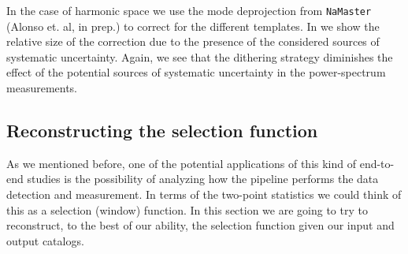 \documentclass[\docopts]{\docclass}
\begin{document}
In the case of harmonic space we use the mode deprojection from \texttt{NaMaster} (Alonso et. al, in prep.) to correct for the different templates. In  we show the relative size of the correction due to the presence of the considered sources of systematic uncertainty. Again, we see that the dithering strategy diminishes the effect of the potential sources of systematic uncertainty in the power-spectrum measurements.





\subsection{Reconstructing the selection function}

As we mentioned before, one of the potential applications of this kind of end-to-end studies is the possibility of analyzing how the pipeline performs the data detection and measurement. In terms of the two-point statistics we could think of this as a selection (window) function. In this section we are going to try to reconstruct, to the best of our ability, the selection function given our input and output catalogs.
\end{document}
